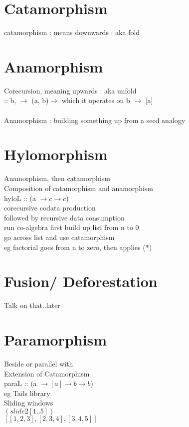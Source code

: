 \documentclass{article}
\begin{document}
\section{Catamorphism}
catamorphism : means downwards : aka fold
\\
\section{Anamorphism}
Corecursion, meaning upwards : aka unfold
\\
:: b, $\rightarrow$ (a, b)$\rightarrow$  which it operates on b
$\rightarrow$ [a]
\\
\\
Anamorphism : building something up from a seed analogy
\\
\section{Hylomorphism}
Anamorphism, then catamorphism
\\
Composition of catamorphism and anamorphism
\\
hyloL :: (a $\rightarrow c \rightarrow c$)
\\
corecursive codata production
\\
followed by recursive data consumption
\\
run co-algebra first build up list from n to 0
\\
go across list and use catamorphism
\\
eg factorial goes from n to zero, then applies (*)
\\
\section{Fusion/ Deforestation}
Talk on that..later
\\
\section{Paramorphism}
Beside or parallel with
\\
Extension of Catamorphism
\\
paraL :: (a $\rightarrow [a] \rightarrow b \rightarrow b$)
\\
eg Tails library
\\
Sliding windows 
\\
$(slide 2 [1..5])$
\\
$[[1, 2, 3], [2, 3, 4], [3, 4, 5]]$
\\
\\
\end{document}
